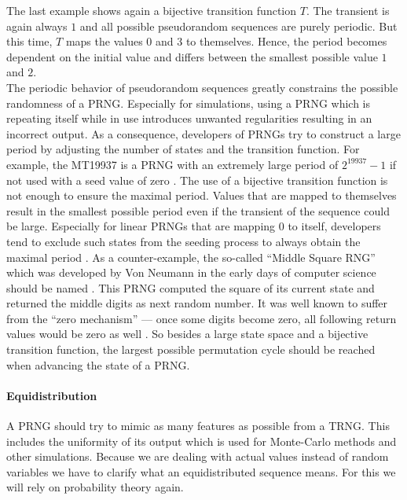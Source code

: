 \documentclass{stdlocal}
\begin{document}
    \noindent
    The last example shows again a bijective transition function $T$.
    The transient is again always $1$ and all possible pseudorandom sequences are purely periodic.
    But this time, $T$ maps the values $0$ and $3$ to themselves.
    Hence, the period becomes dependent on the initial value and differs between the smallest possible value $1$ and $2$.\\
    The periodic behavior of pseudorandom sequences greatly constrains the possible randomness of a PRNG.
    Especially for simulations, using a PRNG which is repeating itself while in use introduces unwanted regularities resulting in an incorrect output.
    As a consequence, developers of PRNGs try to construct a large period by adjusting the number of states and the transition function.
    For example, the MT19937 is a PRNG with an extremely large period of $2^{19937}-1$ if not used with a seed value of zero \autocite{matsumoto1998}.
    The use of a bijective transition function is not enough to ensure the maximal period.
    Values that are mapped to themselves result in the smallest possible period even if the transient of the sequence could be large.
    Especially for linear PRNGs that are mapping $0$ to itself, developers tend to exclude such states from the seeding process to always obtain the maximal period \autocite{marsaglia2003,blackman2019}.
    As a counter-example, the so-called \enquote{Middle Square RNG} which was developed by Von Neumann in the early days of computer science should be named \autocites[\ppno~12-15]{kneusel2018}{widynski2019}.
    This PRNG computed the square of its current state and returned the middle digits as next random number.
    It was well known to suffer from the \enquote{zero mechanism} --- once some digits become zero, all following return values would be zero as well \autocites[\ppno~12-15]{kneusel2018}{widynski2019}.
    So besides a large state space and a bijective transition function, the largest possible permutation cycle should be reached when advancing the state of a PRNG.

    \paragraph{Equidistribution}
    A PRNG should try to mimic as many features as possible from a TRNG.
    This includes the uniformity of its output which is used for Monte-Carlo methods and other simulations.
    Because we are dealing with actual values instead of random variables we have to clarify what an equidistributed sequence means.
    For this we will rely on probability theory again.
\end{document}
